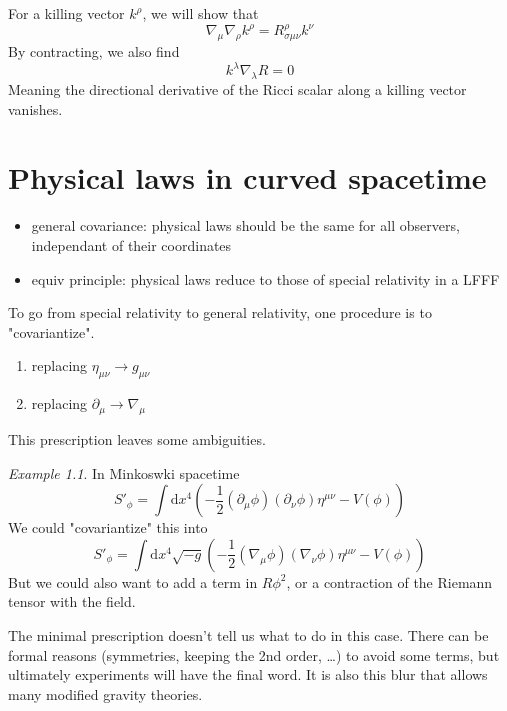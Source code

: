 \documentclass[a4paper]{book}
\theoremstyle{definition}
\theoremstyle{remark}
\newtheorem*{example}{Example}
\begin{document}
For a killing vector $k^\rho$, we will show that 
\begin{equation}
    \nabla_\mu \nabla_\rho k^\rho = R^\rho_{\sigma\mu\nu}k^\nu 
\end{equation}
By contracting, we also find 
\begin{equation}
    k^\lambda \nabla_\lambda R = 0
\end{equation}
Meaning the directional derivative of the Ricci scalar along a killing vector vanishes. 

\chapter{Physical laws in curved spacetime}

\begin{itemize}
    \item general covariance: physical laws should be the same for all observers, independant of their coordinates
    \item equiv principle: physical laws reduce to those of special relativity in a LFFF 
\end{itemize}

To go from special relativity to general relativity, one procedure is to "covariantize". 
\begin{enumerate}
    \item replacing $\eta_{\mu\nu} \rightarrow g_{\mu\nu}$
    \item replacing $\partial_\mu \rightarrow \nabla_\mu$
\end{enumerate}

This prescription leaves some ambiguities. 
\begin{example}
    In Minkoswki spacetime 
    \begin{equation}
        S'_\phi = \int \text{d}x^4 \left( -\frac{1}{2}(\partial_\mu \phi)(\partial_\nu \phi) \eta^{\mu\nu} - V(\phi)\right)
    \end{equation}
    We could "covariantize" this into 
    \begin{equation}
        S'_\phi = \int \text{d}x^4 \sqrt{-g}\left( -\frac{1}{2}(\nabla_\mu \phi)(\nabla_\nu \phi) \eta^{\mu\nu} - V(\phi)\right)
    \end{equation}
    But we could also want to add a term in $R\phi^2$, or a contraction of the Riemann tensor with the field. 
\end{example}
The minimal prescription doesn't tell us what to do in this case. There can be formal reasons (symmetries, keeping the 2nd order, \dots) to avoid some terms, but ultimately experiments will have the final word. It is also this blur that allows many modified gravity theories. \par \medskip 
\end{document}
